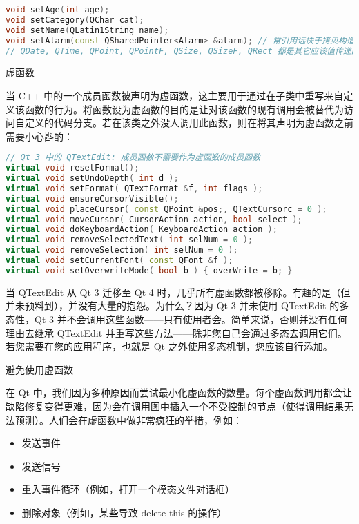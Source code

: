 \begin{lstlisting}[language=C++]
void setAge(int age);
void setCategory(QChar cat);
void setName(QLatin1String name);
void setAlarm(const QSharedPointer<Alarm> &alarm); // 常引用远快于拷贝构造和析构
// QDate, QTime, QPoint, QPointF, QSize, QSizeF, QRect 都是其它应该值传递的好例子
\end{lstlisting}

虚函数

当 C++ 中的一个成员函数被声明为虚函数，这主要用于通过在子类中重写来自定义该函数的行为。将函数设为虚函数的目的是让对该函数的现有调用会被替代为访问自定义的代码分支。若在该类之外没人调用此函数，则在将其声明为虚函数之前需要小心斟酌：

\begin{lstlisting}[language=C++]
// Qt 3 中的 QTextEdit: 成员函数不需要作为虚函数的成员函数
virtual void resetFormat();
virtual void setUndoDepth( int d );
virtual void setFormat( QTextFormat &f, int flags );
virtual void ensureCursorVisible();
virtual void placeCursor( const QPoint &pos;, QTextCursorc = 0 );
virtual void moveCursor( CursorAction action, bool select );
virtual void doKeyboardAction( KeyboardAction action );
virtual void removeSelectedText( int selNum = 0 );
virtual void removeSelection( int selNum = 0 );
virtual void setCurrentFont( const QFont &f );
virtual void setOverwriteMode( bool b ) { overWrite = b; }
\end{lstlisting}

当 QTextEdit 从 Qt 3 迁移至 Qt 4 时，几乎所有虚函数都被移除。有趣的是（但并未预料到），并没有大量的抱怨。为什么？因为 Qt 3 并未使用 QTextEdit 的多态性，Qt 3 并不会调用这些函数——只有使用者会。简单来说，否则并没有任何理由去继承 QTextEdit 并重写这些方法——除非您自己会通过多态去调用它们。若您需要在您的应用程序，也就是 Qt 之外使用多态机制，您应该自行添加。

避免使用虚函数

在 Qt 中，我们因为多种原因而尝试最小化虚函数的数量。每个虚函数调用都会让缺陷修复变得更难，因为会在调用图中插入一个不受控制的节点（使得调用结果无法预测）。人们会在虚函数中做非常疯狂的举措，例如：

\begin{itemize}
\item 发送事件
\item 发送信号
\item 重入事件循环（例如，打开一个模态文件对话框）
\item 删除对象（例如，某些导致 delete this 的操作）
\end{itemize}

